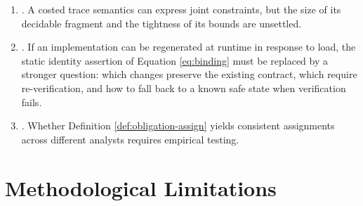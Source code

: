 \begin{enumerate}[label=(O\arabic*)]
\item {}. A costed
      trace semantics can express joint constraints, but the size of its decidable fragment
      and the tightness of its bounds are unsettled.
\item {}.
      If an implementation can be regenerated at runtime in response to load, the static
      identity assertion of Equation \eqref{eq:binding} must be replaced by a stronger
      question: which changes preserve the existing contract, which require re-verification,
      and how to fall back to a known safe state when verification fails.
\item {}. Whether Definition
      \ref{def:obligation-assign} yields consistent assignments across different analysts
      requires empirical testing.
\end{enumerate}

\section{Methodological Limitations}

